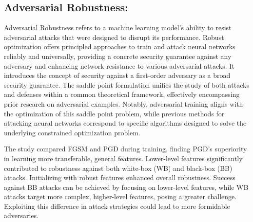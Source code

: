 \documentclass{article}
\begin{document}
\subsection{Adversarial Robustness:} 
Adversarial Robustness refers to a machine learning model’s ability to resist adversarial attacks that were designed to disrupt its performance. 
Robust optimization offers principled approaches to train and attack neural networks reliably and universally, providing a concrete security guarantee against any adversary and enhancing network resistance to various adversarial attacks. It introduces the concept of security against a first-order adversary as a broad security guarantee. The saddle point formulation unifies the study of both attacks and defenses within a common theoretical framework, effectively encompassing prior research on adversarial examples. Notably, adversarial training aligns with the optimization of this saddle point problem, while previous methods for attacking neural networks correspond to specific algorithms designed to solve the underlying constrained optimization problem. \cite{madry2017towards}

\setlength{\parskip}{10pt}
\begingroup
\raggedright
The study compared FGSM and PGD during training, finding PGD's superiority in learning more transferable, general features. Lower-level features significantly contributed to robustness against both white-box (WB) and black-box (BB) attacks. Initializing with robust features enhanced overall robustness. Success against BB attacks can be achieved by focusing on lower-level features, while WB attacks target more complex, higher-level features, posing a greater challenge. Exploiting this difference in attack strategies could lead to more formidable adversaries. \cite{davchev2019empirical}
\endgroup





\end{document}
